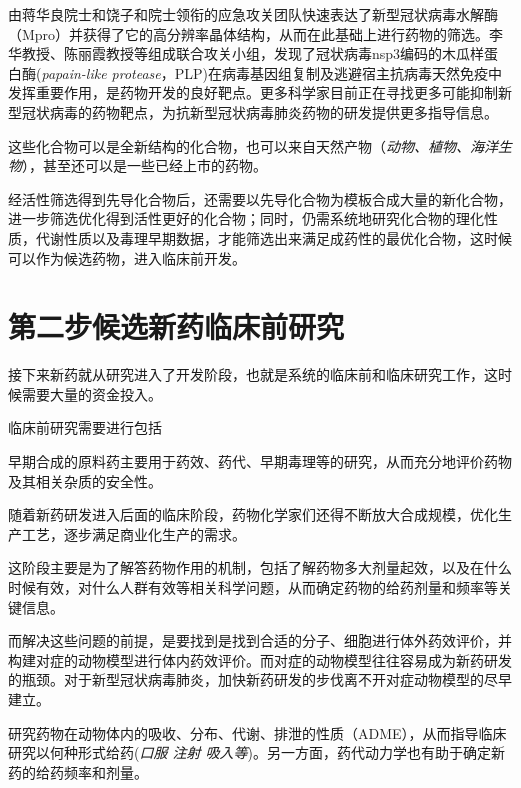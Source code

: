 \begin{multicols}{3}
由蒋华良院士和饶子和院士领衔的应急攻关团队快速表达了新型冠状病毒水解酶（Mpro）并获得了它的高分辨率晶体结构，从而在此基础上进行药物的筛选。李华教授、陈丽霞教授等组成联合攻关小组，发现了冠状病毒nsp3编码的木瓜样蛋白酶(\textit{papain-like protease}，PLP)在病毒基因组复制及逃避宿主抗病毒天然免疫中发挥重要作用，是药物开发的良好靶点。更多科学家目前正在寻找更多可能抑制新型冠状病毒的药物靶点，为抗新型冠状病毒肺炎药物的研发提供更多指导信息。

这些化合物可以是全新结构的化合物，也可以来自天然产物（\textit{动物、植物、海洋生物}），甚至还可以是一些已经上市的药物。

经活性筛选得到先导化合物后，还需要以先导化合物为模板合成大量的新化合物，进一步筛选优化得到活性更好的化合物；同时，仍需系统地研究化合物的理化性质，代谢性质以及毒理早期数据，才能筛选出来满足成药性的最优化合物，这时候可以作为候选药物，进入临床前开发。

\section*{第二步\quad 候选新药临床前研究}

接下来新药就从研究进入了开发阶段，也就是系统的临床前和临床研究工作，这时候需要大量的资金投入。

临床前研究需要进行包括

\noindent{}\quad 早期合成的原料药主要用于药效、药代、早期毒理等的研究，从而充分地评价药物及其相关杂质的安全性。

随着新药研发进入后面的临床阶段，药物化学家们还得不断放大合成规模，优化生产工艺，逐步满足商业化生产的需求。


\noindent{}这阶段主要是为了解答药物作用的机制，包括了解药物多大剂量起效，以及在什么时候有效，对什么人群有效等相关科学问题，从而确定药物的给药剂量和频率等关键信息。

而解决这些问题的前提，是要找到是找到合适的分子、细胞进行体外药效评价，并构建对症的动物模型进行体内药效评价。而对症的动物模型往往容易成为新药研发的瓶颈。对于新型冠状病毒肺炎，加快新药研发的步伐离不开对症动物模型的尽早建立。

\noindent{}研究药物在动物体内的吸收、分布、代谢、排泄的性质（ADME），从而指导临床研究以何种形式给药(\textit{口服 注射 吸入等})。另一方面，药代动力学也有助于确定新药的给药频率和剂量。


\end{multicols}
